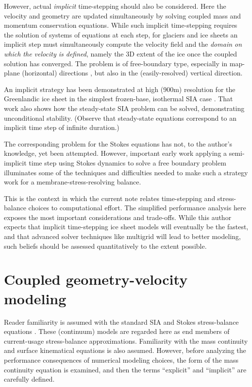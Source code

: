\documentclass[review]{igs}
\begin{document}
However, actual \emph{implicit} time-stepping \citep{LeVeque2007} should also be considered.  Here the velocity and geometry are updated simultaneously by solving coupled mass and momentum conservation equations.  While such implicit time-stepping requires the solution of systems of equations at each step, for glaciers and ice sheets an implicit step must simultaneously compute the velocity field and the \emph{domain on which the velocity is defined}, namely the 3D extent of the ice once the coupled solution has converged.  The problem is of free-boundary type, especially in map-plane (horizontal) directions \citep{SchoofHewitt2013}, but also in the (easily-resolved) vertical direction.

An implicit strategy has been demonstrated at high (900m) resolution for the Greenlandic ice sheet in the simplest frozen-base, isothermal SIA case \citep{Bueler2016}.  That work also shows how the steady-state SIA problem \citep[c.f.][]{JouvetBueler2012} can be solved, demonstrating unconditional stability.  (Observe that steady-state equations correspond to an implicit time step of infinite duration.)

The corresponding problem for the Stokes equations has not, to the author's knowledge, yet been attempted.  However, important early work applying a semi-implicit time step using Stokes dynamics \citep{WirbelJarosch2020} to solve a free boundary problem illuminates some of the techniques and difficulties needed to make such a strategy work for a membrane-stress-resolving balance.

This is the context in which the current note relates time-stepping and stress-balance choices to computational effort.  The simplified performance analysis here exposes the most important considerations and trade-offs.  While this author expects that implicit time-stepping ice sheet models will eventually be the fastest, and that advanced solver techniques like multigrid \citep{Briggsetal2000} will lead to better modeling, such beliefs should be assessed quantitatively to the extent possible.


\section{Coupled geometry-velocity modeling}

Reader familiarity is assumed with the standard SIA and Stokes stress-balance equations \citep{GreveBlatter2009,SchoofHewitt2013}.  These (continuum) models are regarded here as end members of current-usage stress-balance approximations.  Familiarity with the mass continuity and surface kinematical equations \citep{GreveBlatter2009} is also assumed.  However, before analyzing the performance consequences of numerical modeling choices, the form of the mass continuity equation is examined, and then the terms ``explicit'' and ``implicit'' are carefully defined.
\end{document}
